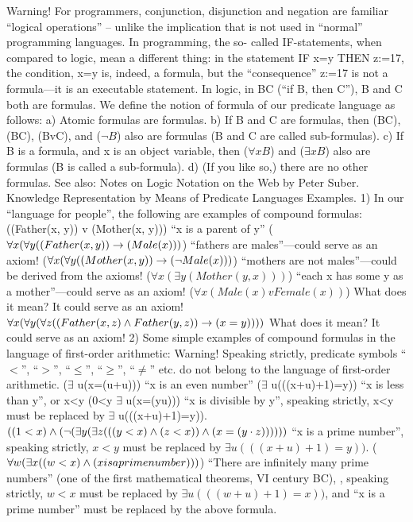 Warning! For programmers, conjunction, disjunction and negation are familiar ``logical operations'' –
unlike the implication that is not used in ``normal'' programming languages. In programming, the so-
called IF-statements, when compared to logic, mean a different thing: in the statement IF x=y THEN
z:=17, the condition, x=y is, indeed, a formula, but the ``consequence'' z:=17 is not a formula---it is an
executable statement. In logic, in B\IMPLIES C (``if B, then C''), B and C both are formulas.
We define the notion of formula of our predicate language as follows:
a) Atomic formulas are formulas.
b) If B and C are formulas, then (B\IMPLIES C), (B\AND C), (BvC), and (\(\neg B\)) also are formulas (B and C are called
sub-formulas).
c) If B is a formula, and x is an object variable, then (\(\forall xB\)) and (\(\exists xB\)) also are formulas (B is called a
sub-formula).
d) (If you like so,) there are no other formulas.
See also:
Notes on Logic Notation on the Web by Peter Suber.
Knowledge Representation by Means of Predicate Languages
Examples. 1) In our ``language for people'', the following are examples of compound formulas:
((Father(x, y)) v (Mother(x, y))) ``x is a parent of y''
(\(\forall x(\forall y((Father(x, y)) \rightarrow  (Male(x)))\)) ``fathers are males''---could serve as an axiom!
(\(\forall x(\forall y((Mother(x, y)) \rightarrow  (\neg Male(x)))\)) ``mothers are not males''---could be derived from the axioms!
(\(\forall x(\exists y(Mother(y, x)))\)) ``each x has some y as a mother''---could serve as an axiom!
(\(\forall x(Male(x) v Female(x))\)) What does it mean? It could serve as an axiom!
\(\forall x(\forall y(\forall z((Father(x, z)\wedge Father(y,z))\rightarrow (x=y))))\) What does it mean? It could serve as an axiom!
2) Some simple examples of compound formulas in the language of first-order arithmetic:
Warning! Speaking strictly, predicate symbols ``\(<\)'', ``\(>\)'', ``\(\leq\)'', ``\(\geq\)'', ``\(\ne\)'' etc. do not belong to the language of first-order
arithmetic.
(\(\exists\) u(x=(u+u))) ``x is an even number''
(\(\exists\) u(((x+u)+1)=y)) ``x is less than y'', or x<y
(0<y \AND  \(\exists\) u(x=(y\cdot u))) ``x is divisible by y'', speaking strictly, x<y must be replaced by \(\exists\) u(((x+u)+1)=y)).
\(((1<x)\wedge (\neg (\exists y(\exists z(((y<x)\wedge (z<x))\wedge (x=(y\cdot z))))))\) ``x is a prime number'', speaking strictly, \(x<y\) must be replaced by \(\exists u(((x+u)+1)=y))\).
(\(\forall w(\exists x((w<x)\wedge (x is a prime number)))\)) ``There are infinitely many prime numbers'' (one of the first mathematical theorems, VI century BC), , speaking strictly, \(w<x\) must be replaced by \(\exists u(((w+u)+1)=x))\), and ``x is a prime number'' must be replaced by the above formula.

